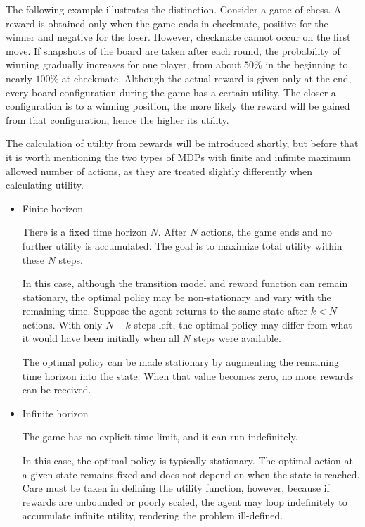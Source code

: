 The following example illustrates the distinction. Consider a game of chess. A reward is obtained only when the game ends in checkmate, positive for the winner and negative for the loser. However, checkmate cannot occur on the first move. If snapshots of the board are taken after each round, the probability of winning gradually increases for one player, from about $50\%$ in the beginning to nearly $100\%$ at checkmate. Although the actual reward is given only at the end, every board configuration during the game has a certain utility. The closer a configuration is to a winning position, the more likely the reward will be gained from that configuration, hence the higher its utility.

The calculation of utility from rewards will be introduced shortly, but before that it is worth mentioning the two types of MDPs with finite and infinite maximum allowed number of actions, as they are treated slightly differently when calculating utility.

\begin{itemize}
	\item Finite horizon
	
	There is a fixed time horizon $N$. After $N$ actions, the game ends and no further utility is accumulated. The goal is to maximize total utility within these $N$ steps.
	
	In this case, although the transition model and reward function can remain stationary, the optimal policy may be non-stationary and vary with the remaining time. Suppose the agent returns to the same state after $k<N$ actions. With only $N-k$ steps left, the optimal policy may differ from what it would have been initially when all $N$ steps were available.
	
	The optimal policy can be made stationary by augmenting the remaining time horizon into the state. When that value becomes zero, no more rewards can be received.
	
	\item Infinite horizon
	
	The game has no explicit time limit, and it can run indefinitely.
	
	In this case, the optimal policy is typically stationary. The optimal action at a given state remains fixed and does not depend on when the state is reached. Care must be taken in defining the utility function, however, because if rewards are unbounded or poorly scaled, the agent may loop indefinitely to accumulate infinite utility, rendering the problem ill-defined.
\end{itemize}

